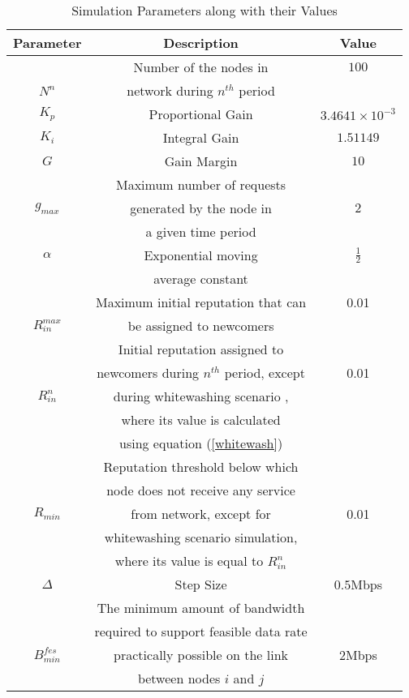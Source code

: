\documentclass[journal]{IEEEtran}
\begin{document}
\begin{table}[]
	\caption{Simulation Parameters along with their Values}
	\centering
	\begin{tabular}{ |c|c|c|}
		\hline
		\textbf{Parameter}  &\textbf{Description} &\textbf{Value} \\
		\hline
		&Number of the nodes in   &$100$ \\ 
		$N^n$    &network  during $n^{th}$ period & \\ 
		\hline
		$K_p$   &Proportional Gain     &$3.4641\times10^{-3}$ \\
		\hline
		$K_i$   &Integral Gain     &$1.51149$ \\
		\hline
		$G$   &Gain Margin     &$10$ \\
		\hline
		&Maximum number of  requests   & \\
		$g_{max}$ &generated by the node in     &$2$ \\
		& a given time period     & \\
		\hline
		$\alpha$   &Exponential moving     &$\frac{1}{2}$ \\
		&average constant & \\
		\hline
		& Maximum initial reputation that can  &0.01\\ 
		${R_{in}^{max}}$               & be assigned to newcomers &  \\
		\hline 
		&  Initial reputation assigned to   &\\
		& newcomers during $n^{th}$ period, except  &0.01  \\  
		${R_{in}^n}$       &  during  whitewashing scenario , &\\
		&   where its value is calculated   & \\
		& using  equation (\ref{whitewash}) &\\
		
		\hline
		& Reputation threshold below which &\\
		& node does not receive any service  &\\
		 ${R_{min}}$   & from network, except for  &0.01\\
		&  whitewashing scenario  simulation,  &\\
		&  where its value is equal to  ${R_{in}^n}$ &\\
		\hline
		$\Delta$   &Step Size     &$0.5$Mbps \\
		\hline
		&  The minimum amount of bandwidth    & \\
		& required to support feasible data rate  & \\   
		$B_{min}^{fes}$              & practically possible on the link&2Mbps\\
		&  between nodes $i$ and $j$ &\\
		\hline
	\end{tabular}
	\label{sim_tab}
\end{table}       
\end{document}
